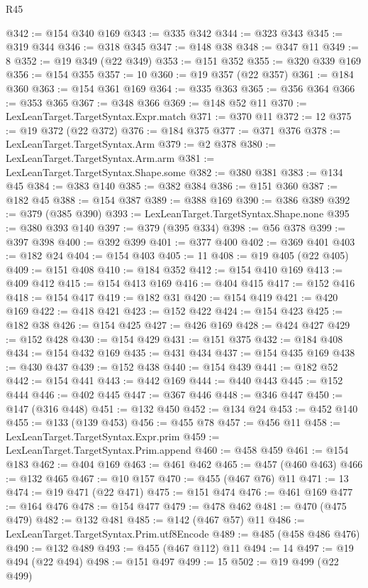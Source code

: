 \begin{lexlean}{R45}
\begin{coremodule}
@342 := @154 @340 @169
@343 := @335 @342
@344 := @323 @343
@345 := @319 @344
@346 := @318 @345
@347 := @148 @38
@348 := @347 @11
@349 := 8
@352 := @19 @349 (@22 @349)
@353 := @151 @352
@355 := @320 @339 @169
@356 := @154 @355
@357 := 10
@360 := @19 @357 (@22 @357)
@361 := @184 @360
@363 := @154 @361 @169
@364 := @335 @363
@365 := @356 @364
@366 := @353 @365
@367 := @348 @366
@369 := @148 @52 @11
@370 := LexLeanTarget.TargetSyntax.Expr.match
@371 := @370 @11
@372 := 12
@375 := @19 @372 (@22 @372)
@376 := @184 @375
@377 := @371 @376
@378 := LexLeanTarget.TargetSyntax.Arm
@379 := @2 @378
@380 := LexLeanTarget.TargetSyntax.Arm.arm
@381 := LexLeanTarget.TargetSyntax.Shape.some
@382 := @380 @381
@383 := @134 @45
@384 := @383 @140
@385 := @382 @384
@386 := @151 @360
@387 := @182 @45
@388 := @154 @387
@389 := @388 @169
@390 := @386 @389
@392 := @379 (@385 @390)
@393 := LexLeanTarget.TargetSyntax.Shape.none
@395 := @380 @393 @140
@397 := @379 (@395 @334)
@398 := @56 @378
@399 := @397 @398
@400 := @392 @399
@401 := @377 @400
@402 := @369 @401
@403 := @182 @24
@404 := @154 @403
@405 := 11
@408 := @19 @405 (@22 @405)
@409 := @151 @408
@410 := @184 @352
@412 := @154 @410 @169
@413 := @409 @412
@415 := @154 @413 @169
@416 := @404 @415
@417 := @152 @416
@418 := @154 @417
@419 := @182 @31
@420 := @154 @419
@421 := @420 @169
@422 := @418 @421
@423 := @152 @422
@424 := @154 @423
@425 := @182 @38
@426 := @154 @425
@427 := @426 @169
@428 := @424 @427
@429 := @152 @428
@430 := @154 @429
@431 := @151 @375
@432 := @184 @408
@434 := @154 @432 @169
@435 := @431 @434
@437 := @154 @435 @169
@438 := @430 @437
@439 := @152 @438
@440 := @154 @439
@441 := @182 @52
@442 := @154 @441
@443 := @442 @169
@444 := @440 @443
@445 := @152 @444
@446 := @402 @445
@447 := @367 @446
@448 := @346 @447
@450 := @147 (@316 @448)
@451 := @132 @450
@452 := @134 @24
@453 := @452 @140
@455 := @133 (@139 @453)
@456 := @455 @78
@457 := @456 @11
@458 := LexLeanTarget.TargetSyntax.Expr.prim
@459 := LexLeanTarget.TargetSyntax.Prim.append
@460 := @458 @459
@461 := @154 @183
@462 := @404 @169
@463 := @461 @462
@465 := @457 (@460 @463)
@466 := @132 @465
@467 := @10 @157
@470 := @455 (@467 @76) @11
@471 := 13
@474 := @19 @471 (@22 @471)
@475 := @151 @474
@476 := @461 @169
@477 := @164 @476
@478 := @154 @477
@479 := @478 @462
@481 := @470 (@475 @479)
@482 := @132 @481
@485 := @142 (@467 @57) @11
@486 := LexLeanTarget.TargetSyntax.Prim.utf8Encode
@489 := @485 (@458 @486 @476)
@490 := @132 @489
@493 := @455 (@467 @112) @11
@494 := 14
@497 := @19 @494 (@22 @494)
@498 := @151 @497
@499 := 15
@502 := @19 @499 (@22 @499)

\end{coremodule}
\end{lexlean}
